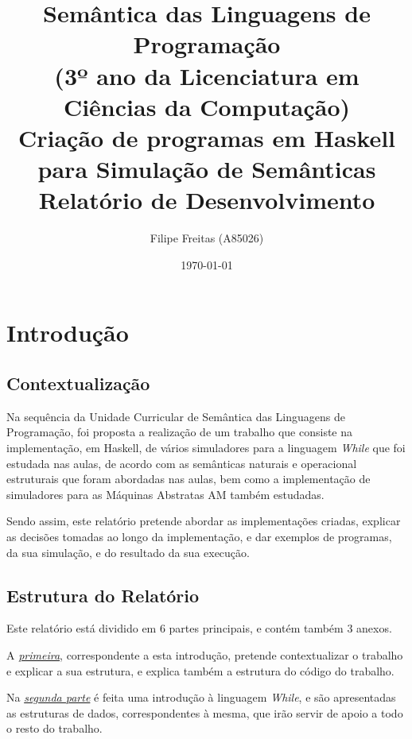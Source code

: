 \documentclass[11pt,a4paper]{report}
\title{Semântica das Linguagens de Programação \\ (3º ano da Licenciatura em Ciências da Computação)\\
       \textbf{Criação de programas em Haskell para Simulação de Semânticas}\\ Relatório de Desenvolvimento
       }
\author{Filipe Freitas (A85026)}
\date{\today}
\newcommand{\while}[0]{\textit{While}\xspace}
\begin{document}
\maketitle


\tableofcontents

\setlength{\parskip}{1em}

\chapter{Introdução} \label{chapter:intro}

\section{Contextualização} \label{section:contexturalizacao}

\par Na sequência da Unidade Curricular de Semântica das Linguagens de Programação, foi proposta a realização de um trabalho que consiste na implementação, em Haskell, de vários simuladores para a linguagem \while que foi estudada nas aulas, de acordo com as semânticas naturais e operacional estruturais que foram abordadas nas aulas, bem como a implementação de simuladores para as Máquinas Abstratas AM também estudadas.

\par Sendo assim, este relatório pretende abordar as implementações criadas, explicar as decisões tomadas ao longo da implementação, e dar exemplos de programas, da sua simulação, e do resultado da sua execução.

\section{Estrutura do Relatório} \label{section:estrutura-relatorio}

\par Este relatório está dividido em 6 partes principais, e contém também 3 anexos.

\par A \hyperref[chapter:intro]{\textit{primeira}}, correspondente a esta introdução, pretende contextualizar o trabalho e explicar a sua estrutura, e explica também a estrutura do código do trabalho.

\par Na \hyperref[chapter:estruturas-linguagem-while]{\textit{segunda parte}} é feita uma introdução à linguagem \while, e são apresentadas as estruturas de dados, correspondentes à mesma, que irão servir de apoio a todo o resto do trabalho.
\end{document}
